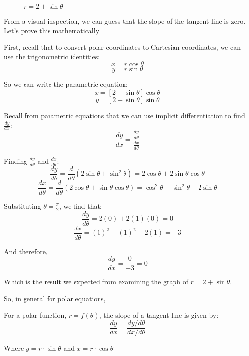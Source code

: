 \begin{figure}[htbp]
\centering
    \label{fig:cardioid}
    \caption{$r = 2 + \sin{\theta}$}
    \end{figure}

From a visual inspection, we can guess that the slope of the tangent line is 
zero. Let's prove this mathematically:

First, recall that to convert polar coordinates to Cartesian coordinates, we 
can use the trigonometric identities:
$$x = r\cos{\theta}$$
$$y = r\sin{\theta}$$

So we can write the parametric equation:
$$x = \left[2 + \sin{\theta} \right]\cos{\theta}$$
$$y = \left[ 2 + \sin{\theta} \right]\sin{\theta}$$

Recall from parametric equations that we can use implicit differentiation to 
find $\frac{dy}{dx}$:
$$\frac{dy}{dx} = \frac{\frac{dy}{d\theta}}{\frac{dx}{d\theta}}$$

Finding $\frac{dy}{d\theta}$ and $\frac{dx}{d\theta}$:
$$\frac{dy}{d\theta} = \frac{d}{d\theta} \left( 2\sin{\theta} + \sin^2{\theta} 
\right) = 2\cos{\theta} + 2\sin{\theta}\cos{\theta}$$
$$\frac{dx}{d\theta} = \frac{d}{d\theta} \left( 2\cos{\theta} + \sin{\theta}
\cos{\theta} \right) = \cos^2{\theta} - \sin^2{\theta} - 2\sin{\theta}$$

Substituting $\theta = \frac{\pi}{2}$, we find that:
$$\frac{dy}{d\theta} = 2(0) + 2(1)(0) = 0$$
$$\frac{dx}{d\theta} = (0)^2 - (1)^2 - 2(1) = -3$$

And therefore,
$$\frac{dy}{dx} = \frac{0}{-3} = 0$$

Which is the result we expected from examining the graph of $r = 2 + \sin{
\theta}$. 

So, in general for polar equations, 
\begin{mdframed}[style=important, frametitle={Tangent to a Polar Function}]
For a polar function, $r = f(\theta)$, the slope of a tangent line is given by:
$$\frac{dy}{dx} = \frac{dy/d\theta}{dx/d\theta}$$

Where $y = r \cdot \sin{\theta}$ and $x = r \cdot \cos{\theta}$
\end{mdframed}


